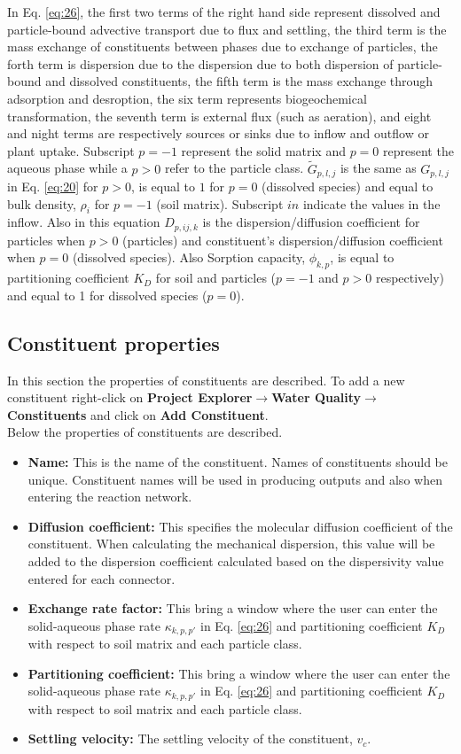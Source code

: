 In Eq. \ref{eq:26}, the first two terms of the right hand side represent dissolved and particle-bound advective transport due to flux and settling, the third term is the mass exchange of constituents between phases due to exchange of particles, the forth term is dispersion due to the dispersion due to both dispersion of particle-bound and dissolved constituents, the fifth term is the mass exchange through adsorption and desroption, the six term represents biogeochemical transformation, the seventh term is external flux (such as aeration), and eight and night terms are respectively sources or sinks due to inflow and outflow or plant uptake. Subscript $p=-1$ represent the solid matrix and $p=0$ represent the aqueous phase while a $p>0$ refer to the particle class. $\tilde G_{p,l,j}$ is the same as $G_{p,l,j}$ in Eq. \ref{eq:20} for $p>0$, is equal to $1$ for $p=0$ (dissolved species) and equal to bulk density, $\rho_i$ for $p=-1$ (soil matrix). Subscript $in$ indicate the values in the inflow. Also in this equation $D_{p,ij,k}$ is the dispersion/diffusion coefficient for particles when $p>0$ (particles) and constituent's dispersion/diffusion coefficient when $p=0$ (dissolved species). Also Sorption capacity, $\phi_{k,p}$, is equal to partitioning coefficient $K_D$ for soil and particles ($p=-1$ and $p>0$ respectively) and equal to 1 for dissolved species ($p=0$).  

\subsection{Constituent properties}
In this section the properties of constituents are described. To  add a new constituent right-click on \textbf{Project Explorer}$\rightarrow$\textbf{Water Quality}$\rightarrow$\textbf{Constituents} and click on \textbf{Add Constituent}. \\
Below the properties of constituents are described.
\begin{itemize}
\item \textbf{Name: } This is the name of the constituent. Names of constituents should be unique. Constituent names will be used in producing outputs and also when entering the reaction network. 
\item \textbf{Diffusion coefficient: } This specifies the molecular diffusion coefficient of the constituent. When calculating the mechanical dispersion, this value will be added to the dispersion coefficient calculated based on the dispersivity value entered for each connector. 
\item \textbf{Exchange rate factor: } This bring a window where the user can enter the solid-aqueous phase rate $\kappa_{k,p,p'}$ in Eq. \ref{eq:26} and partitioning coefficient $K_D$ with respect to soil matrix and each particle class. 
\item \textbf{Partitioning coefficient: } This bring a window where the user can enter the solid-aqueous phase rate $\kappa_{k,p,p'}$ in Eq. \ref{eq:26} and partitioning coefficient $K_D$ with respect to soil matrix and each particle class. 
\item \textbf{Settling velocity: } The settling velocity of the constituent, $v_c$. 
\end{itemize}


